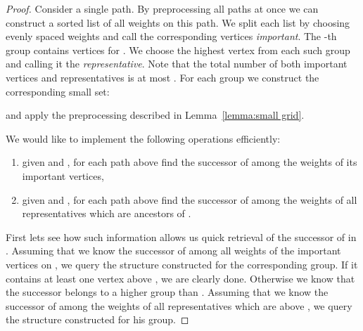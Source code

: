 \documentclass[runningheads]{llncs}
\begin{document}
\begin{proof}
Consider a single path. By preprocessing all paths at once we can construct a sorted list of all weights  on this path. We split each list by choosing  evenly spaced weights  and call the corresponding vertices \emph{important}. The -th group contains vertices  for . We choose the highest vertex from each such group and calling it the {\it representative}. Note that the total number of both important vertices and representatives is at most .  For each group we construct the corresponding small set:

and apply the preprocessing described in Lemma~\ref{lemma:small grid}.

We would like to implement the following operations efficiently:
\begin{enumerate}
\item given  and , for each path above  find the successor of  among the weights of its important vertices,
\item given  and , for each path above  find the successor of  among the weights of all representatives which are ancestors of .
\end{enumerate}
First lets see how such information allows us quick retrieval of the successor of  in . Assuming that we know the successor of  among all weights of the important vertices on , we query the structure constructed for the corresponding group. If it contains at least one vertex above , we are clearly done. Otherwise we know that the successor belongs to a higher group than . Assuming that we know the successor of  among the weights of all representatives which are above , we query the structure constructed for his group.


\end{proof}
\end{document}
